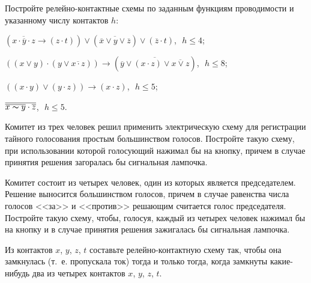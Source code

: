 \begin{problemList}
		{Постройте релейно-контактные схемы по заданным функциям проводимости и указанному числу контактов $h$:}
		{%
		\begin{belarusianEnumerate}
			\item $(\overline{x \cdot \overline{y} \cdot z} \to (z \cdot t)) \vee
			(\overline{\overline{x} \vee y \vee \overline{z}}) \vee (\overline{z} \cdot t)$,\,\, $h \le 4$;
			
			\item $((x \vee y) \cdot (y \vee \overline{x \cdot z})) \to (\overline{\overline{y} \vee
				(x \cdot z) \vee \overline{x \vee z}})$,\,\, $h \le 8$;
			
			\item $((x \cdot y) \vee (y \cdot z)) \to (x \cdot z)$,\,\, $h \le 5$;
			
			\item $\overline{\overline{x \thicksim y} \cdot \overline{z}}$,\,\, $h \le 5$.
		\end{belarusianEnumerate}%
		}
	
		\bigskip
		
		{Комитет из трех человек решил применить электрическую схему для регистрации тайного голосования простым большинством голосов. Постройте такую схему, при использовании которой голосующий нажимал бы на кнопку, причем в случае принятия решения загоралась бы сигнальная лампочка.}
		
		\bigskip
		
		{Комитет состоит из четырех человек, один из которых является председателем. Решение выносится большинством голосов, причем в случае равенства числа голосов <<за>> и <<против>> решающим считается голос председателя. Постройте такую схему, чтобы, голосуя, каждый из четырех человек нажимал бы на кнопку и в случае принятия решения зажигалась бы сигнальная лампочка.}
		
		 \bigskip
		 
		 {Из контактов $x$, $y$, $z$, $t$ составьте релейно-контактную схему так, чтобы она замкнулась (т.~е. пропускала ток) тогда и только тогда, когда замкнуты какие-нибудь два из четырех контактов $x$, $y$, $z$, $t$.}
	\end{problemList}

